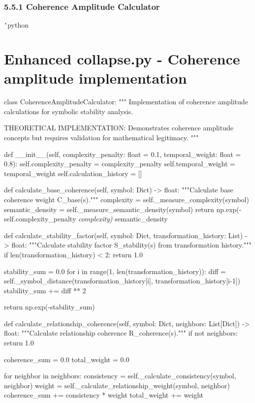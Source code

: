 \subsection{5.5.1 Coherence Amplitude Calculator}

\texttt{`}python
\chapter{Enhanced collapse.py - Coherence amplitude implementation}
class CoherenceAmplitudeCalculator:
    """
    Implementation of coherence amplitude calculations for symbolic stability analysis.
    
    THEORETICAL IMPLEMENTATION: Demonstrates coherence amplitude concepts
    but requires validation for mathematical legitimacy.
    """
    
    def __init__(self, complexity_penalty: float = 0.1, temporal_weight: float = 0.8):
        self.complexity_penalty = complexity_penalty
        self.temporal_weight = temporal_weight
        self.calculation_history = []
        
    def calculate_base_coherence(self, symbol: Dict) -> float:
        """Calculate base coherence weight C_base(s)."""
        complexity = self._measure_complexity(symbol)
        semantic_density = self._measure_semantic_density(symbol)
        return np.exp(-self.complexity_penalty \textit{ complexity) } semantic_density
        
    def calculate_stability_factor(self, symbol: Dict, transformation_history: List) -> float:
        """Calculate stability factor S_stability(s) from transformation history."""
        if len(transformation_history) < 2:
            return 1.0
            
        stability_sum = 0.0
        for i in range(1, len(transformation_history)):
            diff = self._symbol_distance(transformation_history[i], transformation_history[i-1])
            stability_sum += diff ** 2
            
        return np.exp(-stability_sum)
        
    def calculate_relationship_coherence(self, symbol: Dict, neighbors: List[Dict]) -> float:
        """Calculate relationship coherence R_coherence(s)."""
        if not neighbors:
            return 1.0
            
        coherence_sum = 0.0
        total_weight = 0.0
        
        for neighbor in neighbors:
            consistency = self._calculate_consistency(symbol, neighbor)
            weight = self._calculate_relationship_weight(symbol, neighbor)
            coherence_sum += consistency * weight
            total_weight += weight
            
